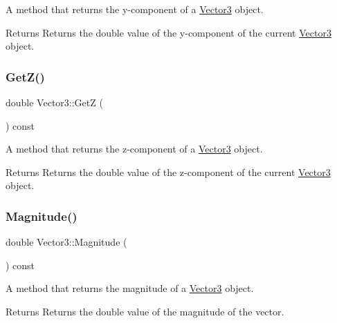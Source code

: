 A method that returns the y-\/component of a \hyperlink{classVector3}{Vector3} object. 

\begin{DoxyReturn}{Returns}
Returns the double value of the y-\/component of the current \hyperlink{classVector3}{Vector3} object. 
\end{DoxyReturn}
\mbox{\label{classVector3_a4212c6c9c1c49feedf6de46522286e45}} 
\subsubsection{\texorpdfstring{Get\+Z()}{GetZ()}}
{\footnotesize\ttfamily double Vector3\+::\+GetZ (\begin{DoxyParamCaption}{ }\end{DoxyParamCaption}) const}



A method that returns the z-\/component of a \hyperlink{classVector3}{Vector3} object. 

\begin{DoxyReturn}{Returns}
Returns the double value of the z-\/component of the current \hyperlink{classVector3}{Vector3} object. 
\end{DoxyReturn}
\mbox{\label{classVector3_a96e6e436600d1420250ef2868854988d}} 
\subsubsection{\texorpdfstring{Magnitude()}{Magnitude()}}
{\footnotesize\ttfamily double Vector3\+::\+Magnitude (\begin{DoxyParamCaption}{ }\end{DoxyParamCaption}) const}



A method that returns the magnitude of a \hyperlink{classVector3}{Vector3} object. 

\begin{DoxyReturn}{Returns}
Returns the double value of the magnitude of the vector. 
\end{DoxyReturn}
\mbox{\label{classVector3_af53c537196154cdc5c3caf6cb9990719}} 
